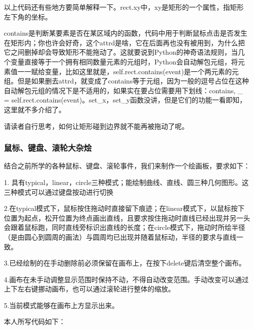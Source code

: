 \documentclass[12pt]{article}
\begin{document}
以上代码还有些地方要简单解释一下。rect.xy中，xy是矩形的一个属性，指矩形左下角的坐标。

contains是判断某要素是否在某区域内的函数，代码中用于判断鼠标点击是否发生在矩形内；你也许会好奇，这个attrd是啥，它在后面再也没有被用到，为什么把它之间删掉却会导致矩形不能拖动了。这就要说到Python的神奇语法规则，当几个变量直接等于一个拥有相同数量元素的元组时，Python会自动解包元组，将元素值一一赋给变量，比如这里就是，self.rect.contains(event)是一个两元素的元组。但是如果删去attrd，就变成了contains等于元组，因为一般的逗号占位在这种自动解包元组的情况下是不适用的，如果实在要占位需要用下划线：contains, \_ = self.rect.contains(event)。set\_x，set\_y函数没讲，但是它们的功能一看即知，这里就不多介绍了。

请读者自行思考，如何让矩形碰到边界就不能再被拖动了呢。
\subsubsection{鼠标、键盘、滚轮大杂烩}
结合之前所学的各种鼠标、键盘、滚轮事件，我们来制作一个绘画板，要求如下：

1. 具有typical，linear，circle三种模式；能绘制曲线、直线、圆三种几何图形。这三种模式可以通过键盘按动进行切换

2.在typical模式下，鼠标按住拖动时直接留下痕迹；在linear模式下，以鼠标按下位置为起点，松开位置为终点画出直线，且要求按住拖动时直线已经出现并另一头会跟着鼠标跑，同时直线旁标识出直线的长度；在circle模式下，拖动时所绘半径（是由圆心到圆周的画法）与圆周均已出现并随着鼠标动，半径的要求与直线一致。

3.已经绘制的在手动删除前必须保留在画布上，在按下delete键后清空整个画布。

4.画布在未手动调整显示范围时保持不动，不得自动改变范围。手动改变可以通过上下左右键挪动画布，也可以通过滚轮进行整体的缩放。

5.当前模式能够在画布上方显示出来。

本人所写代码如下：
\end{document}
